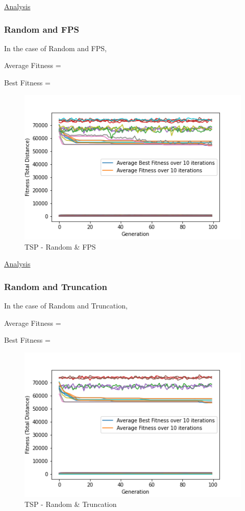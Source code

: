\documentclass[11pt, letterpaper]{article}
\begin{document}
\underline{Analysis}
\subsubsection {Random and FPS}
In the case of Random and FPS,

Average Fitness = 

Best Fitness = 
\begin{figure}[H]
    \centering
    \includegraphics[scale = 0.6]{images/tsp_rd_fp.png}
    \caption {TSP - Random \& FPS}
    \label {fig:tpsRB}
\end{figure}

\underline{Analysis}
\subsubsection {Random and Truncation}
In the case of Random and Truncation,

Average Fitness = 

Best Fitness = 
\begin{figure}[H]
    \centering
    \includegraphics[scale = 0.6]{images/tsp_rd_tr.png}
    \caption {TSP - Random \& Truncation}
    \label {fig:tpsRT}
\end{figure}
\end{document}
